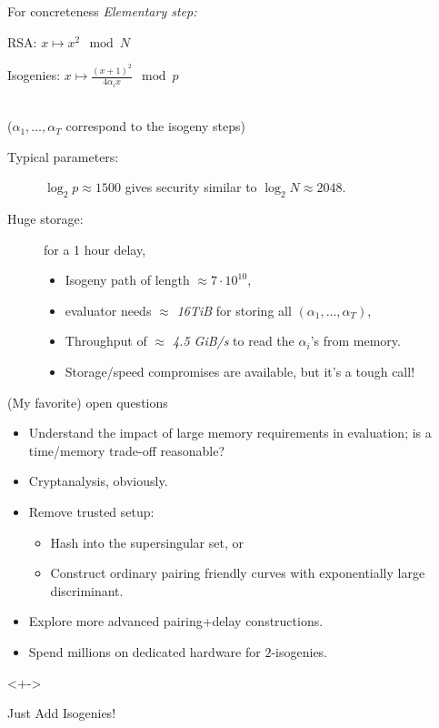 \documentclass[aspectratio=169]{beamer}
\begin{document}
\begin{frame}{For concreteness}
  \emph{Elementary step:}
  \medskip
  
  \hspace{2em} RSA: \hfill $x \longmapsto x^2\mod N$ \hspace{4em}

  \vfill
  \hspace{2em} Isogenies: \hfill $\displaystyle x \longmapsto \frac{(x+1)^2}{4\alpha_ix}\mod p$ \hspace{4em}\strut\\
  {\hspace{2em}\normalsize\color{gray} ($\alpha_1,\dots,\alpha_T$ correspond to the isogeny steps)}

  \vfill
  \begin{description}
  \item[Typical parameters:] \emph{$\log_2 p \approx 1500$} gives
    security similar to $\log_2 N \approx 2048$.
  \item[Huge storage:] for a 1 hour delay,
    \begin{itemize}
    \item Isogeny path of length \emph{$\approx 7 \cdot 10^{10}$},
    \item evaluator needs \emph{$\approx$ 16TiB} for storing all
      $(\alpha_1,\dots,\alpha_T)$,
    \item Throughput of \emph{$\approx$ 4.5 GiB/s} to read the
      $\alpha_i$'s from memory.
    \item Storage/speed compromises are available, but it's a tough call!
    \end{itemize}
  \end{description}
\end{frame}


\begin{frame}{(My favorite) open questions}
  \begin{itemize}
  \item Understand the impact of large memory requirements in
    evaluation; is a time/memory trade-off reasonable?
  \item Cryptanalysis, obviously.
  \item Remove trusted setup:
    \begin{itemize}
    \item Hash into the supersingular set, or
    \item Construct ordinary pairing friendly curves with
      exponentially large discriminant.
    \end{itemize}
  \item Explore more advanced pairing+delay constructions.
  \item Spend millions on dedicated hardware for $2$-isogenies.
  \end{itemize}

  \bigskip
  \begin{uncoverenv}<+->
    \begin{center}
      \Large Just Add Isogenies\texttrademark!
    \end{center}
  \end{uncoverenv}
\end{frame}
\end{document}
